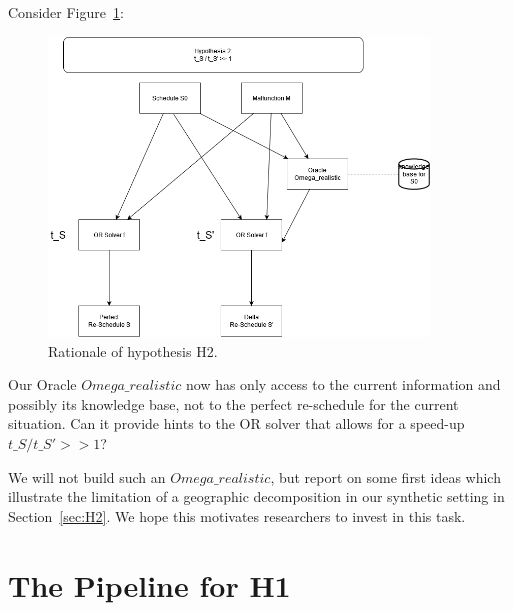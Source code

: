 \documentclass{article}
\begin{document}
Consider Figure~\ref{fig:introduction_H2}:
%
\begin{figure}[hbtp]
	\centering
  \includegraphics[width=0.9\textwidth]{introduction_H2.png}
	\caption{Rationale of hypothesis H2.}
	\label{fig:introduction_H2}
\end{figure}
%
Our Oracle $Omega\_realistic$ now has only access to the current information and possibly its knowledge base, not to the perfect re-schedule for the current situation. Can it provide hints to the OR solver that allows for a speed-up $t\_S / t\_S' >> 1$?

We will not build such an $Omega\_realistic$, but report on some first ideas which illustrate the limitation of a geographic decomposition in our synthetic setting in Section~\ref{sec:H2}. We hope this motivates researchers to invest in this task.



\section{The Pipeline for H1}




\end{document}
